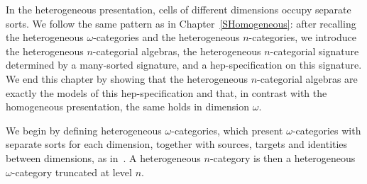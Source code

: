 \documentclass[a4paper, reqno]{amsbook}
\theoremstyle{plain}
\theoremstyle{definition}
\begin{document}
In the heterogeneous presentation, cells of different dimensions occupy separate sorts.
We follow the same pattern as in Chapter~\ref{SHomogeneous}: after recalling the heterogeneous $\omega$-categories and the heterogeneous $n$-categories, we introduce the heterogeneous $n$-categorial algebras, the heterogeneous $n$-categorial signature determined by a many-sorted signature, and a hep-specification on this signature.
We end this chapter by showing that the heterogeneous $n$-categorial algebras are exactly the models of this hep-specification and that, in contrast with the homogeneous presentation, the same holds in dimension $\omega$.

We begin by defining heterogeneous $\omega$-categories, which present $\omega$-categories with separate sorts for each dimension, together with sources, targets and identities between dimensions, as in~\cite{AraEtAl2025}.
A heterogeneous $n$-category is then a heterogeneous $\omega$-category truncated at level $n$.
\end{document}
